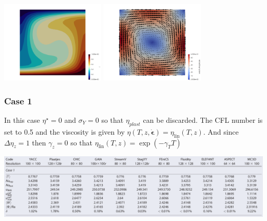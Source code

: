 \includegraphics[width=5cm]{python_codes/fieldstone_28/results_case0/temp}
\includegraphics[width=5cm]{python_codes/fieldstone_28/results_case0/vel}



\newpage %
\subsubsection*{Case 1}

In this case $\eta^\star=0$ and $\sigma_Y=0$ so that $\eta_{plast}$ can be discarded.
The CFL number is set to 0.5 and the viscosity is given by 
$\eta(T,z,\dot{\boldsymbol{\epsilon}}) =   \eta_\text{lin}(T,z) $.
And since $\Delta \eta_z=1$ then $\gamma_z=0$ so that
$\eta_\text{lin} (T,z) = \exp(-\gamma_T T )$

\begin{center}
\includegraphics[width=16cm]{python_codes/fieldstone_28/results_case1/tosn15b}
\end{center}


